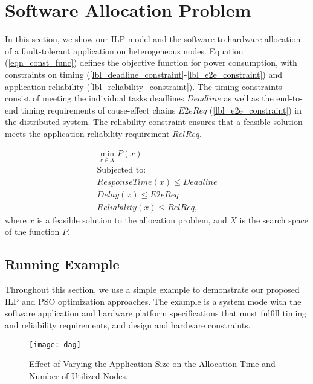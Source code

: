 \section{Software Allocation Problem}\label{sec_allocation}
In this section, we show our ILP model and the software-to-hardware allocation of a fault-tolerant application on heterogeneous nodes. Equation (\ref{eqn_const_func}) defines the objective function for power consumption, with constraints on timing (\ref{lbl_deadline_constraint}-\ref{lbl_e2e_constraint}) and application reliability (\ref{lbl_reliability_constraint}). 
The timing constraints consist of meeting the individual tasks deadlines $Deadline$  as well as the end-to-end timing requirements of cause-effect chains $E2eReq$ (\ref{lbl_e2e_constraint}) in the distributed system. The reliability constraint ensures that a feasible solution meets the application reliability requirement $RelReq$. 

\begin{align}
\label{eqn_const_func}
\min_{x\in X} P(x) \\
\text{Subjected to:}\nonumber\\
\label{lbl_deadline_constraint} 
ResponseTime(x) \leq Deadline\\ 
\label{lbl_e2e_constraint}
Delay(x) \leq E2eReq \\
\label{lbl_reliability_constraint}
Reliability(x) \leq RelReq,
\end{align}
where $x$ is a feasible solution to the allocation problem, and $X$ is the search space of the function $P$.
\subsection{Running Example}
Throughout this section, we use a simple example to demonstrate our proposed ILP and PSO optimization approaches. The example is a system mode with the software application and hardware platform specifications that must fulfill timing and reliability requirements, and design and hardware constraints.
\begin{figure}[t!]
\centering
\texttt{[image: dag]}
\caption{Effect of Varying the Application Size on the Allocation Time and Number of Utilized Nodes.}
\label{fig_increasing_components}
\end{figure}

